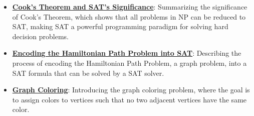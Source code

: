 \documentclass{article}%
\begin{document}
\begin{itemize}[leftmargin=*]
\item \href{https://purdue.brightspace.com/d2l/common/assets/pdfjs-d2l-dist/1.0.14-legacy/web/viewer.html?file=\%2Fcontent\%2Fenforced\%2F1095467-wl.202510.CS.24300.001\%2F15L2-SAT.pdf\%3Fou\%3D1095467\&lang=en-us\&container=d2l-fileviewer-rendered-pdf\&fullscreen=d2l-fileviewer-rendered-pdf-dialog\&height=667#page=54}{\textbf{Cook's Theorem and SAT's Significance}}: Summarizing the significance of Cook's Theorem, which shows that all problems in NP can be reduced to SAT, making SAT a powerful programming paradigm for solving hard decision problems.%
\item \href{https://purdue.brightspace.com/d2l/common/assets/pdfjs-d2l-dist/1.0.14-legacy/web/viewer.html?file=\%2Fcontent\%2Fenforced\%2F1095467-wl.202510.CS.24300.001\%2F15L2-SAT.pdf\%3Fou\%3D1095467\&lang=en-us\&container=d2l-fileviewer-rendered-pdf\&fullscreen=d2l-fileviewer-rendered-pdf-dialog\&height=667#page=40}{\textbf{Encoding the Hamiltonian Path Problem into SAT}}: Describing the process of encoding the Hamiltonian Path Problem, a graph problem, into a SAT formula that can be solved by a SAT solver.%
\item \href{https://purdue.brightspace.com/d2l/common/assets/pdfjs-d2l-dist/1.0.14-legacy/web/viewer.html?file=\%2Fcontent\%2Fenforced\%2F1095467-wl.202510.CS.24300.001\%2F15L2-SAT.pdf\%3Fou\%3D1095467\&lang=en-us\&container=d2l-fileviewer-rendered-pdf\&fullscreen=d2l-fileviewer-rendered-pdf-dialog\&height=667#page=47}{\textbf{Graph Coloring}}: Introducing the graph coloring problem, where the goal is to assign colors to vertices such that no two adjacent vertices have the same color.%
\end{itemize}

%
\end{document}
